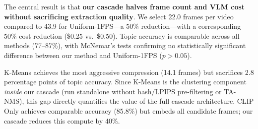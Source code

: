 \documentclass[sigconf,nonacm]{acmart}
\begin{document}
\begin{table}[t]
\centering
\caption{Comparison of 11 frame selection methods on 484 videos. Our cascade halves frame count and VLM cost vs.\ Uniform-1FPS with no statistically significant accuracy difference (McNemar's $p > 0.05$). Best in each column bolded.}
\label{tab:main_comparison}
\end{table}

The central result is that \textbf{our cascade halves frame count and VLM cost without sacrificing extraction quality}. We select 22.0 frames per video compared to 43.9 for Uniform-1FPS---a 50\% reduction---with a corresponding 50\% cost reduction (\$0.25 vs.\ \$0.50). Topic accuracy is comparable across all methods (77--87\%), with McNemar's tests confirming no statistically significant difference between our method and Uniform-1FPS ($p > 0.05$).

K-Means achieves the most aggressive compression (14.1 frames) but sacrifices 2.8 percentage points of topic accuracy. Since K-Means is the clustering component \textit{inside} our cascade (run standalone without hash/LPIPS pre-filtering or TA-NMS), this gap directly quantifies the value of the full cascade architecture. CLIP Only achieves comparable accuracy (85.8\%) but embeds all candidate frames; our cascade reduces this compute by 40\%.
\end{document}
